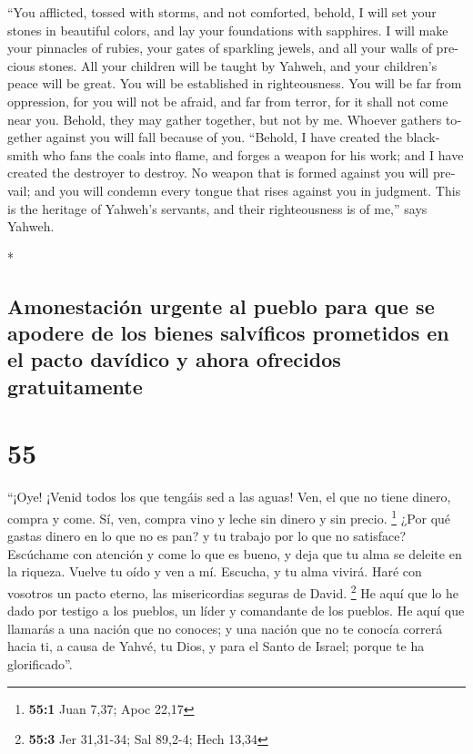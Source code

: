 \begin{paracol}{2}
\begin{otherlanguage}{english}
 ``You afflicted, tossed with storms, and not comforted,
behold, I will set your stones in beautiful colors, and lay your
foundations with sapphires.  I will make your pinnacles
of rubies, your gates of sparkling jewels, and all your walls of
precious stones.  All your children will be taught by
Yahweh, and your children's peace will be great.  You
will be established in righteousness. You will be far from oppression,
for you will not be afraid, and far from terror, for it shall not come
near you.  Behold, they may gather together, but not by
me. Whoever gathers together against you will fall because of you.
 ``Behold, I have created the blacksmith who fans the
coals into flame, and forges a weapon for his work; and I have created
the destroyer to destroy.  No weapon that is formed
against you will prevail; and you will condemn every tongue that rises
against you in judgment. This is the heritage of Yahweh's servants, and
their righteousness is of me,'' says Yahweh.

\end{otherlanguage}

\switchcolumn[0]*

\hypertarget{amonestaciuxf3n-urgente-al-pueblo-para-que-se-apodere-de-los-bienes-salvuxedficos-prometidos-en-el-pacto-davuxeddico-y-ahora-ofrecidos-gratuitamente}{%
\subsection{Amonestación urgente al pueblo para que se apodere de los
bienes salvíficos prometidos en el pacto davídico y ahora ofrecidos
gratuitamente}\label{amonestaciuxf3n-urgente-al-pueblo-para-que-se-apodere-de-los-bienes-salvuxedficos-prometidos-en-el-pacto-davuxeddico-y-ahora-ofrecidos-gratuitamente}}

\hypertarget{section-108}{%
\section{55}\label{section-108}}

 ``¡Oye! ¡Venid todos los que tengáis sed a las aguas!
Ven, el que no tiene dinero, compra y come. Sí, ven, compra vino y leche
sin dinero y sin precio. \footnote{\textbf{55:1} Juan 7,37; Apoc 22,17}
 ¿Por qué gastas dinero en lo que no es pan? y tu trabajo
por lo que no satisface? Escúchame con atención y come lo que es bueno,
y deja que tu alma se deleite en la riqueza.  Vuelve tu
oído y ven a mí. Escucha, y tu alma vivirá. Haré con vosotros un pacto
eterno, las misericordias seguras de David. \footnote{\textbf{55:3} Jer
  31,31-34; Sal 89,2-4; Hech 13,34}  He aquí que lo he
dado por testigo a los pueblos, un líder y comandante de los pueblos.
 He aquí que llamarás a una nación que no conoces; y una
nación que no te conocía correrá hacia ti, a causa de Yahvé, tu Dios, y
para el Santo de Israel; porque te ha glorificado''.


\end{paracol}

